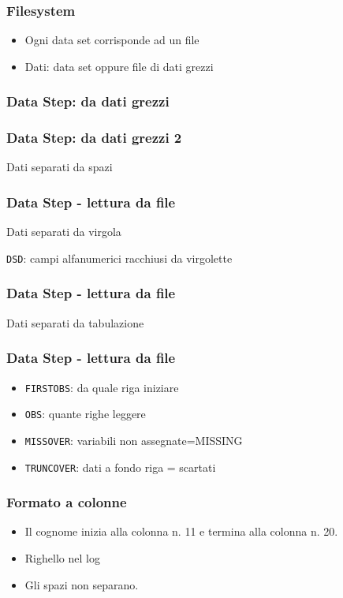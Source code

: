 \documentclass[12pt]{beamer}
\begin{document}
\begin{frame}\frametitle{Filesystem}
  \begin{itemize}
  \item
    Ogni data set corrisponde ad un file
  \item
    Dati: data set oppure file di dati grezzi
  \end{itemize}
\end{frame}

\begin{frame}[fragile]\frametitle{Data Step: da dati grezzi}
\end{frame}

\begin{frame}[fragile]\frametitle{Data Step: da dati grezzi 2}
  Dati separati da spazi
\end{frame}


\begin{frame}[fragile]\frametitle{Data Step - lettura da file }
  Dati separati da virgola

  \texttt{DSD}: campi alfanumerici racchiusi da virgolette
\end{frame}

\begin{frame}[fragile]\frametitle{Data Step - lettura da file }
  Dati separati da tabulazione
\end{frame}

\begin{frame}\frametitle{Data Step - lettura da file }
  \begin{itemize}
  \item
    \texttt{FIRSTOBS}: da quale riga iniziare
  \item
    \texttt{OBS}: quante righe leggere
  \item
    \texttt{MISSOVER}: variabili non assegnate=MISSING
  \item
    \texttt{TRUNCOVER}: dati a fondo riga = scartati
  \end{itemize}
\end{frame}

\begin{frame}[fragile]\frametitle{Formato a colonne}

  \begin{itemize}
  \item
    Il cognome inizia alla colonna n. 11 e termina alla colonna n. 20.
  \item
    Righello nel log
  \item
    Gli spazi non separano.
  \end{itemize}
\end{frame}
\end{document}
